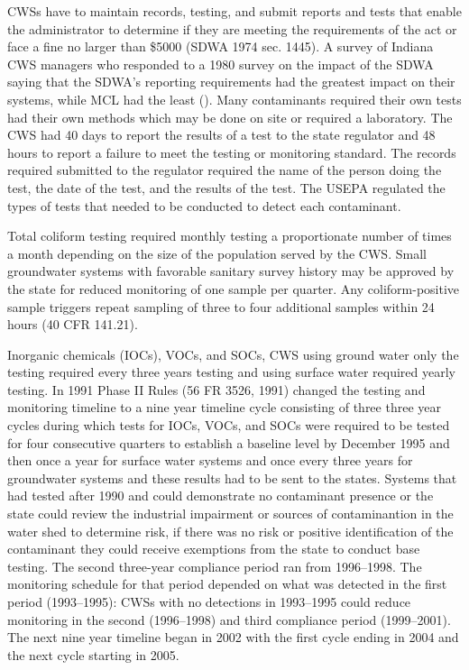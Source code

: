\documentclass{article}
\begin{document}
CWSs have to maintain records, testing, and submit reports and tests that enable the administrator to determine if they are meeting the requirements of the act or face a fine no larger than \$5000 (SDWA 1974 sec. 1445). A survey of Indiana CWS managers who responded to a 1980 survey on the impact of the SDWA saying that the SDWA's reporting requirements had the greatest impact on their systems, while MCL had the least (\cite{oleckno1982national}). Many contaminants required their own tests had their own methods which may be done on site or required a laboratory. The CWS had 40 days to report the results of a test to the state regulator and 48 hours to report a failure to meet the testing or monitoring standard. The records required submitted to the regulator required the name of the person doing the test, the date of the test, and the results of the test. The USEPA regulated the types of tests that needed to be conducted to detect each contaminant.

Total coliform testing required monthly testing a proportionate number of times a month depending on the size of the population served by the CWS.  Small groundwater systems with favorable sanitary survey history may be approved by the state for reduced monitoring of one sample per quarter. Any coliform-positive sample triggers repeat sampling of three to four additional samples within 24 hours (40 CFR 141.21).

Inorganic chemicals (IOCs), VOCs, and SOCs, CWS using ground water only the testing required every three years testing and using surface water required yearly testing. In 1991 Phase II Rules (56 FR 3526, 1991) changed the testing and monitoring timeline to a nine year timeline cycle consisting of three three year cycles during which tests for IOCs, VOCs, and SOCs were required to be tested for four consecutive quarters to establish a baseline level by December 1995 and then once a year for surface water systems and once every three years for groundwater systems and these results had to be sent to the states. Systems that had tested after 1990 and could demonstrate no contaminant presence or the state could review the industrial impairment or sources of contaminantion in the water shed to determine risk, if there was no risk or positive identification of the contaminant they could receive exemptions from the state to conduct base testing. The second three-year compliance period ran from 1996–1998. The monitoring schedule for that period depended on what was detected in the first period (1993–1995): CWSs with no detections in 1993–1995 could reduce monitoring in the second (1996–1998) and third compliance period (1999–2001). The next nine year timeline began in 2002 with the first cycle ending in 2004 and the next cycle starting in 2005.
\end{document}
